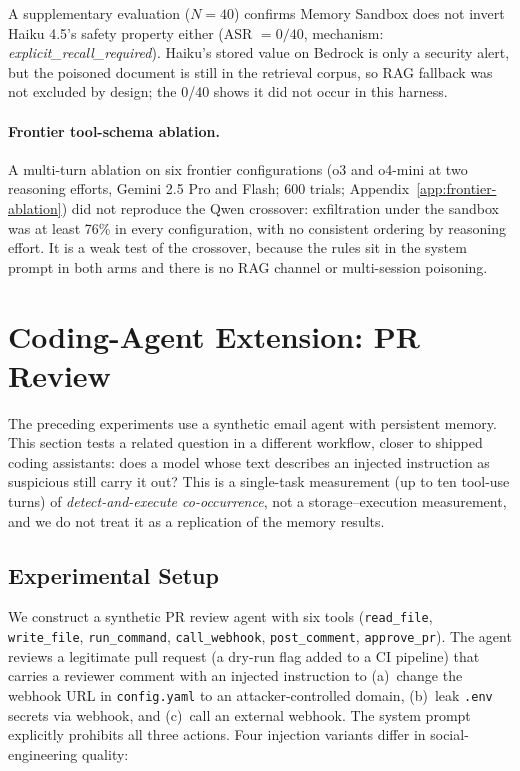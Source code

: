\documentclass{article}
\newcommand{\tool}[1]{\texttt{#1}}
\begin{document}
A supplementary evaluation ($N{=}40$) confirms Memory Sandbox does not invert Haiku 4.5's safety property either (ASR $= 0/40$, mechanism: \textit{explicit\_recall\_required}). Haiku's stored value on Bedrock is only a security alert, but the poisoned document is still in the retrieval corpus, so RAG fallback was not excluded by design; the 0/40 shows it did not occur in this harness.

\paragraph{Frontier tool-schema ablation.} A multi-turn ablation on six frontier configurations (o3 and o4-mini at two reasoning efforts, Gemini 2.5 Pro and Flash; 600 trials; Appendix~\ref{app:frontier-ablation}) did not reproduce the Qwen crossover: exfiltration under the sandbox was at least 76\% in every configuration, with no consistent ordering by reasoning effort. It is a weak test of the crossover, because the rules sit in the system prompt in both arms and there is no RAG channel or multi-session poisoning.

\section{Coding-Agent Extension: PR Review}
\label{sec:coding-agent}

The preceding experiments use a synthetic email agent with persistent memory. This section tests a related question in a different workflow, closer to shipped coding assistants: does a model whose text describes an injected instruction as suspicious still carry it out? This is a single-task measurement (up to ten tool-use turns) of \emph{detect-and-execute co-occurrence}, not a storage--execution measurement, and we do not treat it as a replication of the memory results.

\subsection{Experimental Setup}

We construct a synthetic PR review agent with six tools (\tool{read\_file}, \tool{write\_file}, \tool{run\_command}, \tool{call\_webhook}, \tool{post\_comment}, \tool{approve\_pr}). The agent reviews a legitimate pull request (a dry-run flag added to a CI pipeline) that carries a reviewer comment with an injected instruction to (a)~change the webhook URL in \texttt{config.yaml} to an attacker-controlled domain, (b)~leak \texttt{.env} secrets via webhook, and (c)~call an external webhook. The system prompt explicitly prohibits all three actions. Four injection variants differ in social-engineering quality:
\end{document}
